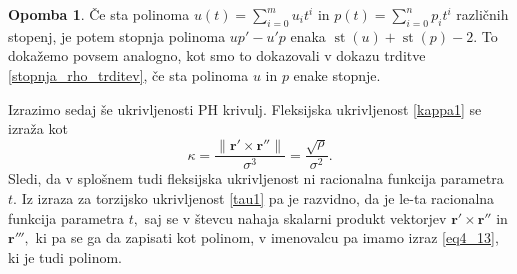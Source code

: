 \documentclass[12pt,a4paper,twoside]{article}
\theoremstyle{definition} %
\newtheorem{opomba}[definicija]{Opomba}
\theoremstyle{plain} %
\theoremstyle{primerstyle}
\numberwithin{equation}{section}  %
\newcommand{\rV}{\mathbf{r}}
\DeclareMathOperator{\st}{st}
\begin{document}
\begin{opomba}
	\label{opomba_proporpoly}
	Če sta polinoma $u(t)=\sum_{i=0}^mu_it^i$ in $p(t)=\sum_{i=0}^np_it^i$ različnih stopenj, je potem stopnja polinoma $up'-u'p$ enaka $\st(u)+\st(p)-2.$ To dokažemo povsem analogno, kot smo to dokazovali v dokazu trditve \ref{stopnja_rho_trditev}, če sta polinoma $u$ in $p$ enake stopnje.  
\end{opomba}

Izrazimo sedaj še ukrivljenosti PH krivulj. Fleksijska ukrivljenost \eqref{kappa1} se izraža kot
\begin{equation}
	\label{kappa2}
	\kappa=\frac{\lVert \rV' \times \rV'' \rVert}{\sigma^3}=\frac{\sqrt{\rho}}{\sigma^2}.
\end{equation}
Sledi, da v splošnem tudi fleksijska ukrivljenost ni racionalna funkcija parametra $t.$ Iz izraza za torzijsko ukrivljenost \eqref{tau1} pa je razvidno, da je le-ta racionalna funkcija parametra $t,$ saj se v števcu nahaja skalarni produkt vektorjev $\rV'\times \rV''$ in $\rV''',$ ki pa se ga da zapisati kot polinom, v imenovalcu pa imamo izraz \eqref{eq4_13}, ki je tudi polinom.
\end{document}
